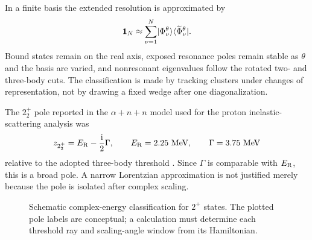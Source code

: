 In a finite basis the extended resolution is approximated by
\begin{equation}
  \mathbf{1}_N
  \approx\sum_{\nu=1}^{N}
  \lvert \Phi_\nu^\theta \rangle
  \langle \widetilde\Phi_\nu^\theta \rvert.
  \label{eq:he6-extended-completeness}
\end{equation}
Bound states remain on the real axis, exposed resonance poles remain stable
as $\theta$ and the basis are varied, and nonresonant eigenvalues follow the
rotated two- and three-body cuts.  The classification is made by tracking
clusters under changes of representation, not by drawing a fixed wedge after
one diagonalization.

The $2_2^+$ pole reported in the $\alpha+n+n$ model used for the proton
inelastic-scattering analysis was
\begin{equation}
  z_{2_2^+}
  =E_{\mathrm{R}}-\frac{\mathrm{i}}{2}\Gamma,
  \qquad
  E_{\mathrm{R}}=2.25\ \mathrm{MeV},
  \qquad
  \Gamma=3.75\ \mathrm{MeV}
  \label{eq:he6-22-published-pole}
\end{equation}
relative to the adopted three-body threshold
\cite{arXiv:2003.05123}.  Since $\Gamma$ is comparable with
$E_{\mathrm{R}}$, this is a broad pole.  A narrow Lorentzian approximation is
not justified merely because the pole is isolated after complex scaling.

\begin{figure}[t]
  \centering
  \caption{Schematic complex-energy classification for $2^+$ states.  The
  plotted pole labels are conceptual; a calculation must determine each
  threshold ray and scaling-angle window from its Hamiltonian.}
  \label{fig:he6-csm-schematic}
\end{figure}

